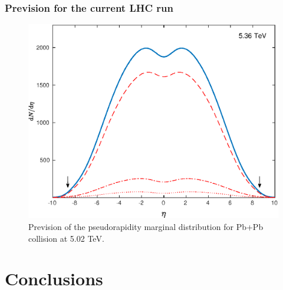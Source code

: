 \documentclass[a4paper,12pt]{book}
\begin{document}
\subsection{Prevision for the current LHC run}
\begin{figure}
	\begin{center}
		\centering
		\includegraphics[width=\linewidth]{images/Pb_536_plot_eta.eps}
		\caption{Prevision of the pseudorapidity marginal distribution for Pb+Pb collision at 5.02 TeV.}
		\label{fig:Pb_536_eta}
	\end{center}
\end{figure}



\chapter{Conclusions}\label{chap:conclusions}


\printbibliography
\end{document}
